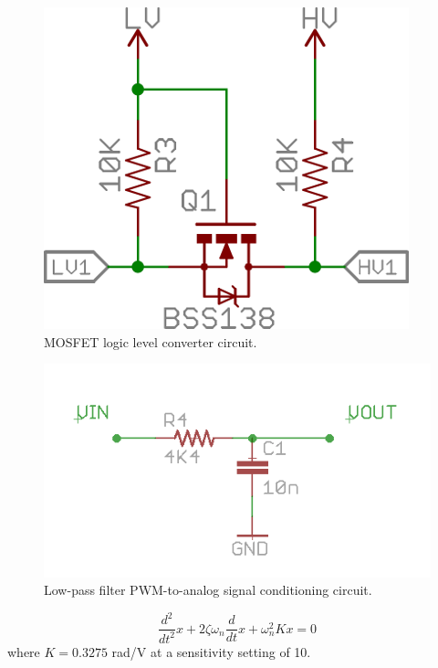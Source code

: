 \documentclass[authoryear]{elsarticle}
\begin{document}
\begin{figure}
  \centering
  \includegraphics[scale=0.3,natwidth=610,natheight=642]{mosfet.png}
  \caption{MOSFET logic level converter circuit.}
  \label{fig:mosfet}
\end{figure}

\begin{figure}
  \centering
  \includegraphics[scale=0.5,natwidth=400,natheight=400]{lowpass.png}
  \caption{Low-pass filter PWM-to-analog signal conditioning circuit.}
  \label{fig:lowpass}
\end{figure}

\begin{equation}
  \frac{d^2}{dt^2}x + 2\zeta\omega_{n}\frac{d}{dt}x + \omega_{n}^2 Kx = 0 
  \label{eq:v_out}
\end{equation}
where $K=0.3275$ rad/V at a sensitivity setting of 10.
\end{document}
